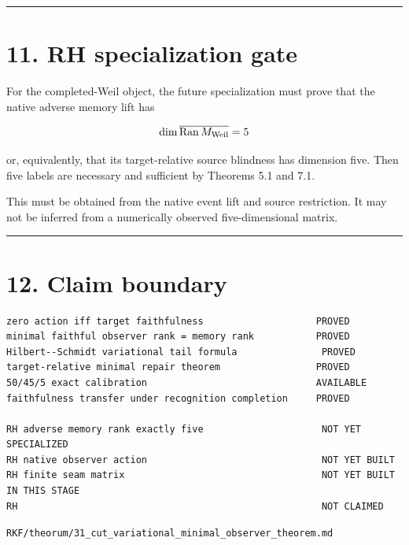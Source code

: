 \begin{center}\rule{0.5\linewidth}{0.5pt}\end{center}

\hypertarget{rh-specialization-gate}{%
\section{11. RH specialization gate}\label{rh-specialization-gate}}

For the completed-Weil object, the future specialization must prove that the
native adverse memory lift has

\[
\dim\overline{\operatorname{Ran}M_{\rm Weil}}=5
\]

or, equivalently, that its target-relative source blindness has dimension five.
Then five labels are necessary and sufficient by Theorems 5.1 and 7.1.

This must be obtained from the native event lift and source restriction. It may
not be inferred from a numerically observed five-dimensional matrix.

\begin{center}\rule{0.5\linewidth}{0.5pt}\end{center}

\hypertarget{claim-boundary}{%
\section{12. Claim boundary}\label{claim-boundary}}

\begin{verbatim}
zero action iff target faithfulness                    PROVED
minimal faithful observer rank = memory rank           PROVED
Hilbert--Schmidt variational tail formula               PROVED
target-relative minimal repair theorem                 PROVED
50/45/5 exact calibration                              AVAILABLE
faithfulness transfer under recognition completion     PROVED

RH adverse memory rank exactly five                     NOT YET SPECIALIZED
RH native observer action                               NOT YET BUILT
RH finite seam matrix                                   NOT YET BUILT IN THIS STAGE
RH                                                      NOT CLAIMED
\end{verbatim}

\begin{flushright}\small\texttt{RKF/theorum/31\_cut\_variational\_minimal\_observer\_theorem.md}\end{flushright}
